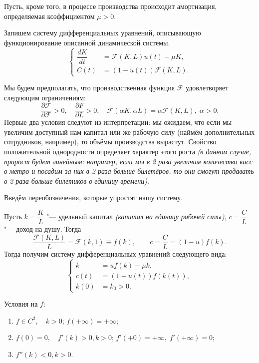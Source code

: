 \documentclass[12pt, a4paper]{article}
\theoremstyle{rusdef}
\renewcommand{\d}{\partial} %
\begin{document}
Пусть, кроме того, в процессе производства происходит амортизация, определяемая коэффициентом $\mu >0$.

Запишем систему дифференциальных уравнений, описывающую функционирование описанной динамической системы.
\[
  \left\{
  \begin{aligned}
    \dfrac{dK}{dt} & = \mathcal{F}(K, L)u(t) - \mu K, \\
    C(t)           & = (1-u(t))\mathcal{F}(K,L).
  \end{aligned}
  \right.
\]

Мы будем предполагать, что производственная функция $\mathcal{F}$ удовлетворяет следующим ограничениям:
\[
  \frac{\d \mathcal{F}}{\d \mathcal{F}} > 0, \quad \frac{\d F}{\d L} > 0, \quad \mathcal{F}(\alpha K, \alpha L) = \alpha \mathcal{F}(K, L), \; \alpha > 0.
\]
Первые два условия следуют из интерпретации: мы ожидаем, что если мы увеличим доступный нам капитал или же рабочую силу (наймём дополнительных сотрудников, например), то объёмы производства вырастут. Свойство положительной однородности определяет характер этого роста \textit{(в данном случае, прирост будет линейным: например, если мы в 2 раза увеличим количество касс в метро и посадим за них в 2 раза больше билетёров, то они смогут продавать в 2 раза больше билетиков в единицу времени)}.

Введём переобозначения, которые упростят нашу систему.

Пусть $k = \dfrac{K}{L}$ "--- удельный капитал \textit{(капитал на единицу рабочей силы)}, $c = \dfrac{C}{L}$ "--- доход на душу. Тогда
\[
  \dfrac{\mathcal{F}(K,L)}{L} = \mathcal{F}(k, 1) \equiv f(k), \qquad c = \dfrac{C}{L} = (1-u)f(k).
\]
Тогда получим систему дифференциальных уравнений следующего вида:
\[
  \left\{
  \begin{aligned}
    \dot{k} & = uf(k) - \mu k,   \\
    c(t)    & = (1-u(t))f(k(t)), \\
    k(0)    & = k_0 > 0.
  \end{aligned}
  \right.
\]

Условия на $f$:
\begin{enumerate}
  \item $f \in C^2, \quad k > 0$; $f(+\infty) = +\infty$;
  \item $f(0) = 0, \quad f'(k) > 0, k > 0$; $f'(+0) = +\infty, \; f'(+\infty) = 0$;
  \item $f''(k) < 0, k > 0$.
\end{enumerate}
\end{document}
